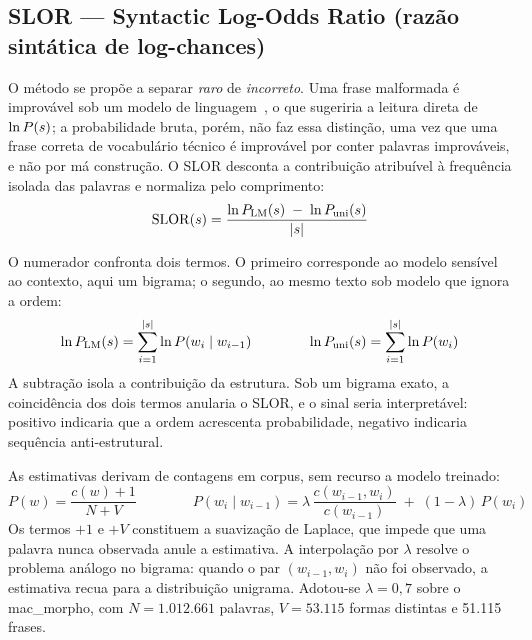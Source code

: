 \subsection{SLOR — Syntactic Log-Odds Ratio (razão sintática de log-chances)}
\label{met:slor}

\indent\indent O método se propõe a separar \emph{raro} de \emph{incorreto}. Uma frase malformada é
improvável sob um modelo de linguagem~\cite{pauls2012,lau2017}, o que sugeriria a leitura
direta de $\ln P(s)$; a probabilidade bruta, porém, não faz essa distinção, uma vez que
uma frase correta de vocabulário técnico é improvável por conter palavras improváveis, e não
por má construção. O SLOR desconta a contribuição atribuível à frequência isolada das palavras
e normaliza pelo comprimento:
%
\begin{equation}
\mathrm{SLOR}(s) = \frac{\ln P_{\mathrm{LM}}(s) \;-\; \ln P_{\mathrm{uni}}(s)}{|s|}
\label{eq:slor}
\end{equation}

O numerador confronta dois termos. O primeiro corresponde ao modelo sensível ao contexto, aqui
um bigrama; o segundo, ao mesmo texto sob modelo que ignora a ordem:
%
\begin{equation}
\ln P_{\mathrm{LM}}(s) = \sum_{i=1}^{|s|} \ln P(w_i \mid w_{i-1})
\qquad\qquad
\ln P_{\mathrm{uni}}(s) = \sum_{i=1}^{|s|} \ln P(w_i)
\label{eq:slor-termos}
\end{equation}
%
A subtração isola a contribuição da estrutura. Sob um bigrama exato, a coincidência dos dois
termos anularia o SLOR, e o sinal seria interpretável: positivo indicaria que a ordem
acrescenta probabilidade, negativo indicaria sequência anti-estrutural.

As estimativas derivam de contagens em corpus, sem recurso a modelo treinado:
%
\begin{equation}
P(w) = \frac{c(w) + 1}{N + V}
\qquad\qquad
P(w_i \mid w_{i-1}) = \lambda\,\frac{c(w_{i-1}, w_i)}{c(w_{i-1})} \;+\; (1-\lambda)\,P(w_i)
\label{eq:slor-estimadores}
\end{equation}
%
Os termos $+1$ e $+V$ constituem a suavização de Laplace, que impede que uma palavra nunca
observada anule a estimativa. A interpolação por $\lambda$ resolve o problema análogo no
bigrama: quando o par $(w_{i-1}, w_i)$ não foi observado, a estimativa recua para a
distribuição unigrama. Adotou-se $\lambda = 0{,}7$ sobre o mac\_morpho, com $N = 1.012.661$
palavras, $V = 53.115$ formas distintas e 51.115 frases.


